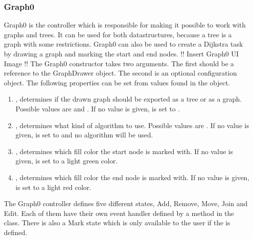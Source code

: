 \subsubsection{Graph0}
Graph0 is the controller which is responsible for making it possible to work with graphs and trees. It can be used for both datastructures, because a tree is a graph with some restrictions. Graph0 can also be used to create a Dijkstra task by drawing a graph and marking the start and end nodes. 
!! Insert Graph0 UI Image !!
The Graph0 constructor takes two arguments. The first should be a reference to the GraphDrawer object. The second is an optional configuration object. The following properties can be set from values found in the object.
\begin{enumerate}
    \item {}, determines if the drawn graph should be exported as a tree or as a graph. Possible values are  and . If no value is given,  is set to .
    \item {}, determines what kind of algorithm to use. Possible values are . If no value is given,  is set to  and no algorithm will be used.
    \item {}, determines which fill color the start node is marked with. If no value is given,  is set to a light green color.
    \item {}, determines which fill color the end node is marked with. If no value is given,  is set to a light red color.
\end{enumerate}
The Graph0 controller defines five different states, Add, Remove, Move, Join and Edit. Each of them have their own event handler defined by a method in the class. There is also a Mark state which is only available to the user if the  is defined.
